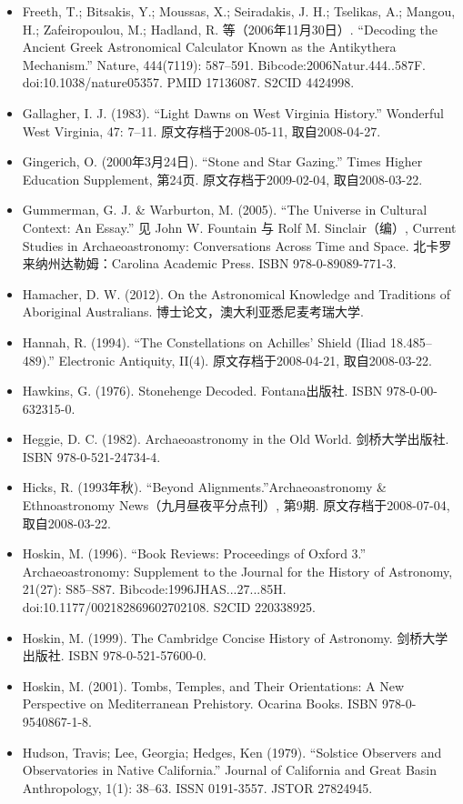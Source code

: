 \begin{itemize}
    \item Freeth, T.; Bitsakis, Y.; Moussas, X.; Seiradakis, J. H.; Tselikas, A.; Mangou, H.; Zafeiropoulou, M.; Hadland, R. 等（2006年11月30日）. “Decoding the Ancient Greek Astronomical Calculator Known as the Antikythera Mechanism.” Nature, 444(7119): 587–591. Bibcode:2006Natur.444..587F. doi:10.1038/nature05357. PMID 17136087. S2CID 4424998.
    \item Gallagher, I. J. (1983). “Light Dawns on West Virginia History.” Wonderful West Virginia, 47: 7–11. 原文存档于2008-05-11, 取自2008-04-27.
    \item Gingerich, O. (2000年3月24日). “Stone and Star Gazing.” Times Higher Education Supplement, 第24页. 原文存档于2009-02-04, 取自2008-03-22.
    \item Gummerman, G. J. \& Warburton, M. (2005). “The Universe in Cultural Context: An Essay.” 见 John W. Fountain 与 Rolf M. Sinclair（编）, Current Studies in Archaeoastronomy: Conversations Across Time and Space. 北卡罗来纳州达勒姆：Carolina Academic Press. ISBN 978-0-89089-771-3.
    \item Hamacher, D. W. (2012). On the Astronomical Knowledge and Traditions of Aboriginal Australians. 博士论文，澳大利亚悉尼麦考瑞大学.
    \item Hannah, R. (1994). “The Constellations on Achilles’ Shield (Iliad 18.485–489).” Electronic Antiquity, II(4). 原文存档于2008-04-21, 取自2008-03-22.
    \item Hawkins, G. (1976). Stonehenge Decoded. Fontana出版社. ISBN 978-0-00-632315-0.
    \item Heggie, D. C. (1982). Archaeoastronomy in the Old World. 剑桥大学出版社. ISBN 978-0-521-24734-4.
    \item Hicks, R. (1993年秋). “Beyond Alignments.”Archaeoastronomy \& Ethnoastronomy News（九月昼夜平分点刊）, 第9期. 原文存档于2008-07-04, 取自2008-03-22.
    \item Hoskin, M. (1996). “Book Reviews: Proceedings of Oxford 3.” Archaeoastronomy: Supplement to the Journal for the History of Astronomy, 21(27): S85–S87. Bibcode:1996JHAS...27...85H. doi:10.1177/002182869602702108. S2CID 220338925.
    \item Hoskin, M. (1999). The Cambridge Concise History of Astronomy. 剑桥大学出版社. ISBN 978-0-521-57600-0.
    \item Hoskin, M. (2001). Tombs, Temples, and Their Orientations: A New Perspective on Mediterranean Prehistory. Ocarina Books. ISBN 978-0-9540867-1-8.
    \item Hudson, Travis; Lee, Georgia; Hedges, Ken (1979). “Solstice Observers and Observatories in Native California.” Journal of California and Great Basin Anthropology, 1(1): 38–63. ISSN 0191-3557. JSTOR 27824945.

\end{itemize}
